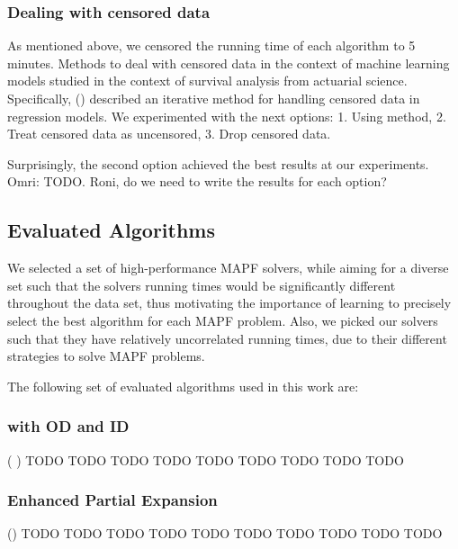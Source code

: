 \documentclass[letterpaper]{article} %
\newcommand\Roni[1]{\nb{\textbf{Roni:}}{red}{#1}}
\begin{document}


\subsubsection{Dealing with censored data}

As mentioned above, we censored the running time of each algorithm to 5 minutes. Methods to deal with censored data in the context of machine learning models studied in the context of survival analysis from actuarial science. Specifically, (\cite{schmee1979simple}) described an iterative method for handling censored data in regression models. We experimented with the next options: 1. Using \cite{schmee1979simple} method, 2. Treat censored data as uncensored, 3. Drop censored data.

Surprisingly, the second option achieved the best results at our experiments. 
Omri: TODO. Roni, do we need to write the results for each option? \Roni{Ideally yes, but not now.}

\subsection{Evaluated Algorithms}
We selected a set of high-performance MAPF solvers, while aiming for a diverse set such that the solvers running times would be significantly different throughout the data set, thus motivating the importance of learning to precisely select the best algorithm for each MAPF problem. Also, we picked our solvers such that they have relatively uncorrelated running times, due to their different strategies to solve MAPF problems.

The following set of evaluated algorithms used in this work are:

\subsubsection{ \astar with OD and ID}
(\cite{standley2010finding} \cite{standley2012independence})
 TODO TODO TODO TODO TODO TODO TODO TODO TODO 
\subsubsection{ Enhanced Partial Expansion \astar }  (\cite{goldenberg2014enhanced})
TODO TODO TODO TODO TODO TODO TODO TODO TODO TODO 
\end{document}
